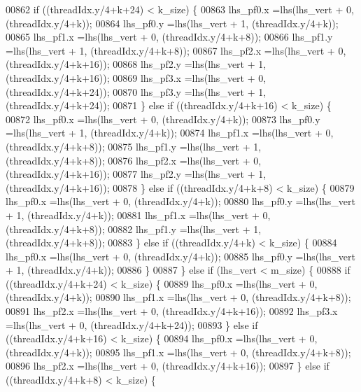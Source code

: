 \begin{DoxyCode}
00862         \textcolor{keywordflow}{if} ((threadIdx.y/4+k+24) < k\_size) \{
00863           lhs\_pf0.x =lhs(lhs\_vert + 0, (threadIdx.y/4+k));
00864           lhs\_pf0.y =lhs(lhs\_vert + 1, (threadIdx.y/4+k));
00865           lhs\_pf1.x =lhs(lhs\_vert + 0, (threadIdx.y/4+k+8));
00866           lhs\_pf1.y =lhs(lhs\_vert + 1, (threadIdx.y/4+k+8));
00867           lhs\_pf2.x =lhs(lhs\_vert + 0, (threadIdx.y/4+k+16));
00868           lhs\_pf2.y =lhs(lhs\_vert + 1, (threadIdx.y/4+k+16));
00869           lhs\_pf3.x =lhs(lhs\_vert + 0, (threadIdx.y/4+k+24));
00870           lhs\_pf3.y =lhs(lhs\_vert + 1, (threadIdx.y/4+k+24));
00871         \} \textcolor{keywordflow}{else} \textcolor{keywordflow}{if} ((threadIdx.y/4+k+16) < k\_size) \{
00872           lhs\_pf0.x =lhs(lhs\_vert + 0, (threadIdx.y/4+k));
00873           lhs\_pf0.y =lhs(lhs\_vert + 1, (threadIdx.y/4+k));
00874           lhs\_pf1.x =lhs(lhs\_vert + 0, (threadIdx.y/4+k+8));
00875           lhs\_pf1.y =lhs(lhs\_vert + 1, (threadIdx.y/4+k+8));
00876           lhs\_pf2.x =lhs(lhs\_vert + 0, (threadIdx.y/4+k+16));
00877           lhs\_pf2.y =lhs(lhs\_vert + 1, (threadIdx.y/4+k+16));
00878         \} \textcolor{keywordflow}{else} \textcolor{keywordflow}{if} ((threadIdx.y/4+k+8) < k\_size) \{
00879           lhs\_pf0.x =lhs(lhs\_vert + 0, (threadIdx.y/4+k));
00880           lhs\_pf0.y =lhs(lhs\_vert + 1, (threadIdx.y/4+k));
00881           lhs\_pf1.x =lhs(lhs\_vert + 0, (threadIdx.y/4+k+8));
00882           lhs\_pf1.y =lhs(lhs\_vert + 1, (threadIdx.y/4+k+8));
00883         \} \textcolor{keywordflow}{else} \textcolor{keywordflow}{if} ((threadIdx.y/4+k) < k\_size) \{
00884           lhs\_pf0.x =lhs(lhs\_vert + 0, (threadIdx.y/4+k));
00885           lhs\_pf0.y =lhs(lhs\_vert + 1, (threadIdx.y/4+k));
00886         \}
00887       \} \textcolor{keywordflow}{else} \textcolor{keywordflow}{if} (lhs\_vert < m\_size) \{
00888         \textcolor{keywordflow}{if} ((threadIdx.y/4+k+24) < k\_size) \{
00889           lhs\_pf0.x =lhs(lhs\_vert + 0, (threadIdx.y/4+k));
00890           lhs\_pf1.x =lhs(lhs\_vert + 0, (threadIdx.y/4+k+8));
00891           lhs\_pf2.x =lhs(lhs\_vert + 0, (threadIdx.y/4+k+16));
00892           lhs\_pf3.x =lhs(lhs\_vert + 0, (threadIdx.y/4+k+24));
00893         \} \textcolor{keywordflow}{else} \textcolor{keywordflow}{if} ((threadIdx.y/4+k+16) < k\_size) \{
00894           lhs\_pf0.x =lhs(lhs\_vert + 0, (threadIdx.y/4+k));
00895           lhs\_pf1.x =lhs(lhs\_vert + 0, (threadIdx.y/4+k+8));
00896           lhs\_pf2.x =lhs(lhs\_vert + 0, (threadIdx.y/4+k+16));
00897         \} \textcolor{keywordflow}{else} \textcolor{keywordflow}{if} ((threadIdx.y/4+k+8) < k\_size) \{

\end{DoxyCode}
